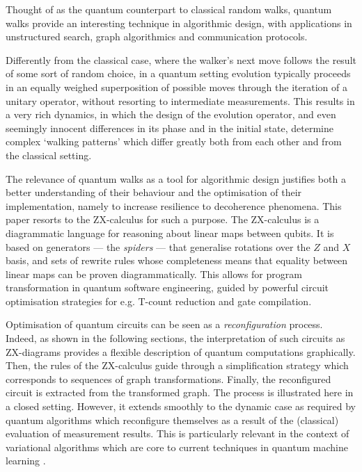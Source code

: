 
Thought of as the quantum counterpart to classical random walks, quantum walks \cite{QW-overview} provide an interesting technique in algorithmic design, 
with  applications in unstructured search, graph algorithmics and communication protocols.

Differently from the classical case, where the  walker's next move follows the result of some sort of random choice, in a quantum setting evolution typically 
proceeds in an equally weighed superposition of possible moves through the iteration of a unitary operator, without resorting to intermediate measurements. 
This results in a very rich dynamics, in which the design of the evolution operator, and even seemingly
innocent differences  in its phase  and in the initial state, determine complex `walking patterns'  
which differ greatly both from each other and from the classical setting.

The relevance of quantum walks as a tool for algorithmic design justifies both a better understanding of their behaviour and the optimisation of their implementation, namely to increase resilience to decoherence phenomena. This  paper resorts to the ZX-calculus \cite{CoeckeD08,ZX-overview,CoeckeHKW22} for such a purpose. The ZX-calculus is a diagrammatic language for reasoning about linear maps between qubits. It is based on generators --- the \emph{spiders} --- that generalise rotations over the $Z$ and $X$ basis, and sets of rewrite rules whose completeness means that  equality between linear maps can be proven diagrammatically. This allows for program transformation in quantum software engineering, guided by powerful  circuit optimisation strategies for e.g. T-count reduction and gate compilation.

Optimisation of quantum circuits can be seen as a \emph{reconfiguration} process. Indeed, as shown in the following sections, the interpretation of such circuits as ZX-diagrams provides a flexible description of quantum computations graphically. Then, the rules of the ZX-calculus guide through a simplification strategy which corresponds to sequences of graph transformations. Finally, the reconfigured  circuit is extracted from the transformed graph. The process is illustrated here in a closed setting. However, it extends smoothly to the dynamic case as required by quantum algorithms which reconfigure themselves as a result of the (classical) evaluation of measurement results.  This is particularly relevant in the context of variational algorithms \cite{Cer21} which are core to current techniques in quantum machine learning \cite{Dun16}.



